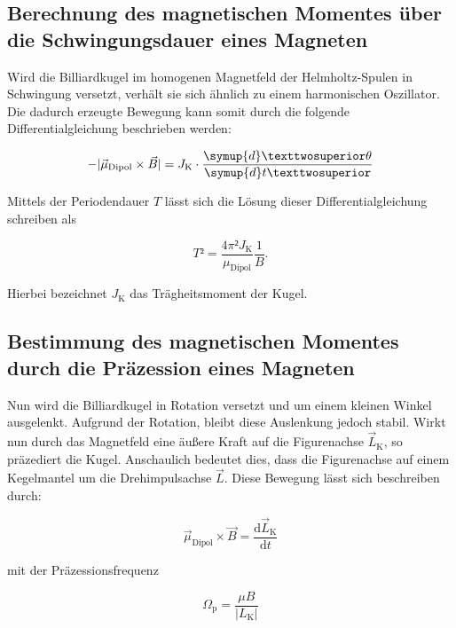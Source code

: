 \subsection{Berechnung des magnetischen Momentes über die Schwingungsdauer eines Magneten}

\noindent Wird die Billiardkugel im homogenen Magnetfeld der Helmholtz-Spulen in Schwingung versetzt, verhält sie sich 
ähnlich zu einem harmonischen Oszillator. Die dadurch erzeugte Bewegung kann somit durch die folgende Differentialgleichung
beschrieben werden:

\begin{equation*}
    - | \vec{\mu}_\text{Dipol} \times \vec{B} | = J_\text{K} \cdot \frac{\symup{d}²\theta}{\symup{d}t²}
\end{equation*}

\noindent Mittels der Periodendauer $T$ lässt sich die Lösung dieser Differentialgleichung schreiben als 

\begin{equation*}
    T² = \frac{4\pi²J_\text{K}}{\mu_\text{Dipol}}\frac{1}{B}.
\end{equation*}

\noindent Hierbei bezeichnet $J_\text{K}$ das Trägheitsmoment der Kugel.

\subsection{Bestimmung des magnetischen Momentes durch die Präzession eines Magneten}

\noindent Nun wird die Billiardkugel in Rotation versetzt und um einem kleinen Winkel ausgelenkt. Aufgrund 
der Rotation, bleibt diese Auslenkung jedoch stabil. Wirkt nun durch das Magnetfeld eine äußere Kraft auf die 
Figurenachse $\vec{L}_\text{K}$, so präzediert die Kugel. Anschaulich bedeutet dies, dass die Figurenachse auf einem Kegelmantel 
um die Drehimpulsachse $\vec{L}$. Diese Bewegung lässt sich beschreiben durch:

\begin{equation*}
    \vec{\mu}_\text{Dipol} \times \vec{B} = \frac{\text{d}\vec{L}_\text{K}}{\text{d}t}
\end{equation*}

\noindent mit der Präzessionsfrequenz 

\begin{equation*}
    \Omega_\text{p} = \frac{\mu B}{| L_\text{K} |}
\end{equation*}

